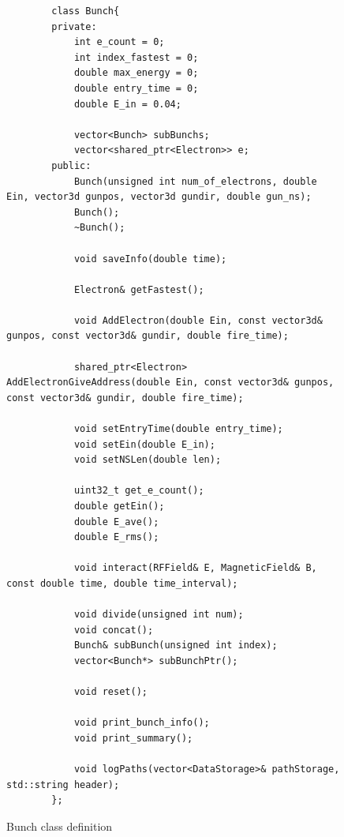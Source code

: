\documentclass[a4paper,oneside,12pt]{report}
\numberwithin{equation}{chapter}
\begin{document}
\begin{figure}[H]
    \centering
    \captionsetup{justification=centering}
    \begin{verbatim}
        class Bunch{
        private:
            int e_count = 0;
            int index_fastest = 0;
            double max_energy = 0;
            double entry_time = 0;
            double E_in = 0.04;

            vector<Bunch> subBunchs;
            vector<shared_ptr<Electron>> e;
        public:
            Bunch(unsigned int num_of_electrons, double Ein, vector3d gunpos, vector3d gundir, double gun_ns);
            Bunch();
            ~Bunch();

            void saveInfo(double time);

            Electron& getFastest();

            void AddElectron(double Ein, const vector3d& gunpos, const vector3d& gundir, double fire_time);

            shared_ptr<Electron> AddElectronGiveAddress(double Ein, const vector3d& gunpos, const vector3d& gundir, double fire_time);

            void setEntryTime(double entry_time);
            void setEin(double E_in);
            void setNSLen(double len);

            uint32_t get_e_count();
            double getEin();
            double E_ave();
            double E_rms();

            void interact(RFField& E, MagneticField& B, const double time, double time_interval);

            void divide(unsigned int num);
            void concat();
            Bunch& subBunch(unsigned int index);
            vector<Bunch*> subBunchPtr();

            void reset();

            void print_bunch_info();
            void print_summary();

            void logPaths(vector<DataStorage>& pathStorage, std::string header);
        };
    \end{verbatim}
    \caption{Bunch class definition}
    \label{fig:bunch_class}
\end{figure}
\end{document}
